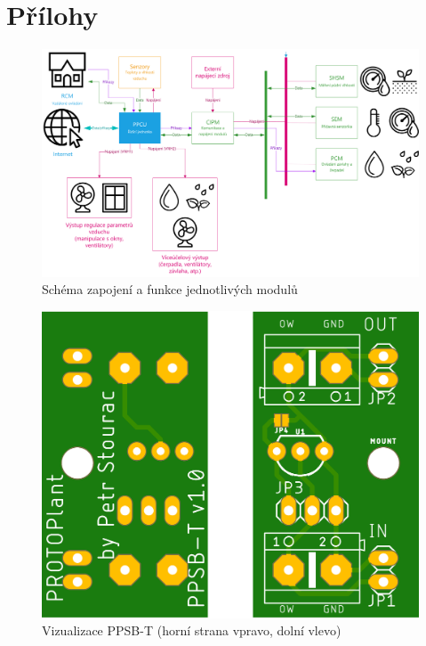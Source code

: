 \chapter*{Přílohy}

\begin{figure}[htbp]
    \centering
    \includegraphics[angle=90,origin=c,scale=0.7]{img/HARDWARE/MODULES.png}
    \caption{Schéma zapojení a funkce jednotlivých modulů}
    \label{fig:add-MODULES}
 \end{figure}

 \begin{figure}[h]
    \centering
    \includegraphics[width=\textwidth]{img/HARDWARE/PPSB-T_BOTH.png}
    \caption{Vizualizace PPSB-T (horní strana vpravo, dolní vlevo)}
    \label{fig:PPSB-T_VISUAL}
\end{figure}

